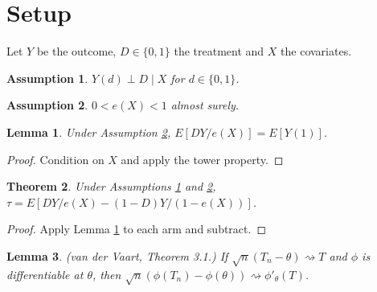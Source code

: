 \documentclass{article}
\newtheorem{thm}{Theorem}
\newtheorem{lem}[thm]{Lemma}
\newtheorem{assumption}{Assumption}
\begin{document}
\section{Setup}
Let $Y$ be the outcome, $D \in \{0,1\}$ the treatment and $X$ the covariates.

\begin{assumption}\label{ass:unconf}
$Y(d) \perp D \mid X$ for $d \in \{0,1\}$.
\end{assumption}

\begin{assumption}\label{ass:overlap}
$0 < e(X) < 1$ almost surely.
\end{assumption}

\begin{lem}\label{lem:ipw}
Under Assumption \ref{ass:overlap}, $E[DY/e(X)] = E[Y(1)]$.
\end{lem}
\begin{proof}
Condition on $X$ and apply the tower property.
\end{proof}

\begin{thm}\label{thm:ate}
Under Assumptions \ref{ass:unconf} and \ref{ass:overlap}, $\tau = E[DY/e(X) - (1-D)Y/(1-e(X))]$.
\end{thm}
\begin{proof}
Apply Lemma \ref{lem:ipw} to each arm and subtract.
\end{proof}

\begin{lem}\label{lem:delta}
(van der Vaart, Theorem 3.1.) If $\sqrt{n}(T_n - \theta) \rightsquigarrow T$ and $\phi$ is differentiable at $\theta$, then $\sqrt{n}(\phi(T_n) - \phi(\theta)) \rightsquigarrow \phi'_\theta(T)$.
\end{lem}
\end{document}
